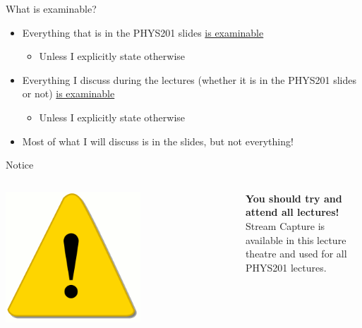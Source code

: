 \begin{frame}{What is examinable?}

\begin{itemize}
  \item Everything that is in the PHYS201 slides \underline{is examinable}
  \begin{itemize}
      \item Unless I explicitly state otherwise
  \end{itemize}

  \vspace{0.3cm}

  \item Everything I discuss during the lectures (whether it is in the PHYS201 slides or not) \underline{is examinable}
  \begin{itemize}
      \item Unless I explicitly state otherwise
  \end{itemize}

  \vspace{0.3cm}

  \item Most of what I will discuss is in the slides, but not everything!

\end{itemize}


\begin{block001}{Notice}
\begin{columns}
  \begin{column}{0.15\textwidth}
   \begin{center}
     \includegraphics[width=0.60\textwidth]{./images/icons/warning.png}\\
   \end{center}
  \end{column}
  \begin{column}{0.85\textwidth}
  {\small
     {\bf You should try and attend all lectures!}\\
     Stream Capture is available in this lecture theatre and used for all PHYS201 lectures.
   }
  \end{column}
\end{columns}
\end{block001}


\end{frame}


